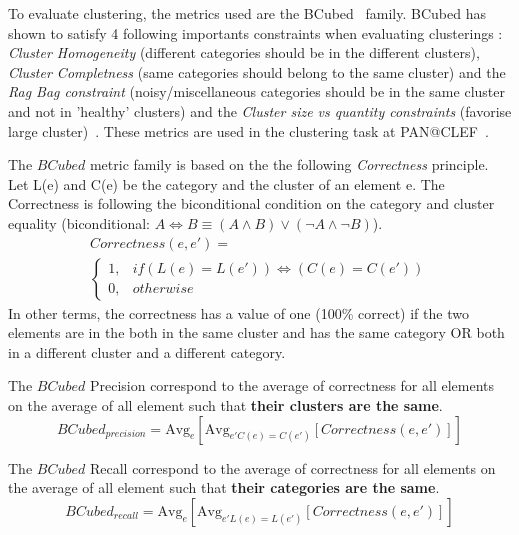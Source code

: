 To evaluate clustering, the metrics used are the BCubed~\cite{bcubed} family.
BCubed has shown to satisfy 4 following importants constraints when evaluating clusterings : \textit{Cluster Homogeneity} (different categories should be in the different clusters), \textit{Cluster Completness} (same categories should belong to the same cluster) and the \textit{Rag Bag constraint} (noisy/miscellaneous categories should be in the same cluster and not in 'healthy' clusters) and the \textit{Cluster size vs quantity constraints} (favorise large cluster)~\cite{bcubed}.
These metrics are used in the clustering task at PAN@CLEF~\cite{pan16}.

\begin{definition}
  The $BCubed$ metric family is based on the the following \textit{Correctness} principle.
  Let L(e) and C(e) be the category and the cluster of an element e.
  The Correctness is following the biconditional condition on the category and cluster equality (biconditional: $A \Longleftrightarrow B \equiv (A \land B) \lor (\neg A \land \neg B)$).
  \begin{gather*}
    Correctness(e, e') = \\
    \begin{cases}
      1, & if (L(e) = L(e')) \Longleftrightarrow (C(e) = C(e'))\\
      0, & otherwise
    \end{cases}
  \end{gather*}
  In other terms, the correctness has a value of one (100\% correct) if the two elements are in the both in the same cluster and has the same category OR both in a different cluster and a different category.
\end{definition}

\begin{definition}
  The $BCubed$ Precision correspond to the average of correctness for all elements on the average of all element such that \textbf{their clusters are the same}.
  \begin{equation}
    BCubed_{precision} = \text{Avg}_{e}[\text{Avg}_{e' C(e)=C(e')}[Correctness(e, e')]]
  \end{equation}
\end{definition}

\begin{definition}
  The $BCubed$ Recall correspond to the average of correctness for all elements on the average of all element such that \textbf{their categories are the same}.
  \begin{equation}
    BCubed_{recall} = \text{Avg}_{e}[\text{Avg}_{e' L(e)=L(e')}[Correctness(e, e')]]
  \end{equation}
\end{definition}

